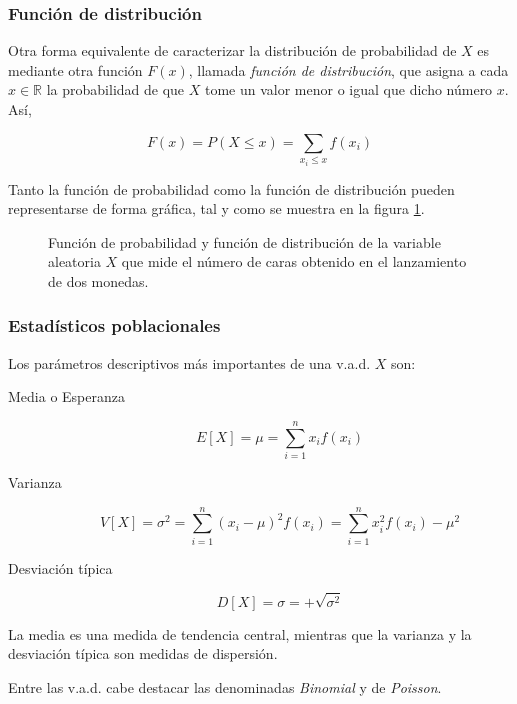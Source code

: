 \subsubsection{Función de distribución}
Otra forma equivalente de caracterizar la distribución de probabilidad de $X$ es mediante otra función $F(x)$, llamada
\emph{función de distribución}, que asigna a cada $x\in \mathbb{R}$ la probabilidad de que $X$ tome un valor menor o
igual que dicho número $x$. Así,

\[
F(x) = P(X \le x) = \sum\limits_{x_i  \le x} {f(x_i)}
\]

Tanto la función de probabilidad como la función de distribución pueden representarse de forma gráfica, tal y como se
muestra en la figura \ref{g:graficasvad}.

\begin{figure}[h!]
\centering {}\qquad
{}
\caption{Función de probabilidad y función de distribución de la variable aleatoria $X$ que mide el número de caras obtenido en el lanzamiento de dos monedas.} \label{g:graficasvad}
\end{figure}


\subsubsection{Estadísticos poblacionales}
Los parámetros descriptivos más importantes de una v.a.d. $X$ son:
\begin{description}
\item [Media o Esperanza]
\[
E[X]=\mu  = \sum\limits_{i = 1}^n {x_i f(x_i )}
\]

\item [Varianza]
\[
V[X]=\sigma ^2  = \sum\limits_{i = 1}^n {(x_i  - \mu )^2 f(x_i ) = }
\sum\limits_{i = 1}^n {x_i ^2 f(x_i ) - \mu ^2 }
\]

\item [Desviación típica]
\[
D[X]=\sigma  =  + \sqrt {\sigma ^2 }
\]
\end{description}

La media es una medida de tendencia central, mientras que la varianza y la desviación típica son medidas de dispersión.

Entre las v.a.d. cabe destacar las denominadas \emph{Binomial} y de \emph{Poisson}.


